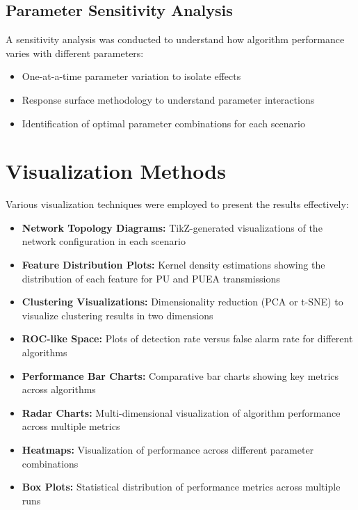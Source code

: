 \subsection{Parameter Sensitivity Analysis}

A sensitivity analysis was conducted to understand how algorithm performance varies with different parameters:

\begin{itemize}
    \item One-at-a-time parameter variation to isolate effects
    \item Response surface methodology to understand parameter interactions
    \item Identification of optimal parameter combinations for each scenario
\end{itemize}

\section{Visualization Methods}

Various visualization techniques were employed to present the results effectively:

\begin{itemize}
    \item \textbf{Network Topology Diagrams:} TikZ-generated visualizations of the network configuration in each scenario
    
    \item \textbf{Feature Distribution Plots:} Kernel density estimations showing the distribution of each feature for PU and PUEA transmissions
    
    \item \textbf{Clustering Visualizations:} Dimensionality reduction (PCA or t-SNE) to visualize clustering results in two dimensions
    
    \item \textbf{ROC-like Space:} Plots of detection rate versus false alarm rate for different algorithms
    
    \item \textbf{Performance Bar Charts:} Comparative bar charts showing key metrics across algorithms
    
    \item \textbf{Radar Charts:} Multi-dimensional visualization of algorithm performance across multiple metrics
    
    \item \textbf{Heatmaps:} Visualization of performance across different parameter combinations
    
    \item \textbf{Box Plots:} Statistical distribution of performance metrics across multiple runs
\end{itemize}

